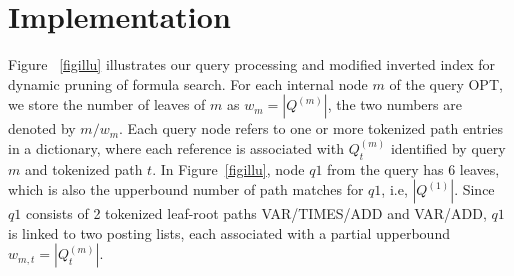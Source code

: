 \documentclass[runningheads]{llncs}
\begin{document}







\section{Implementation}

Figure ~\ref{figillu} illustrates our query processing and modified inverted index for dynamic pruning of formula search.
For each internal node $m$ of the query OPT, we store the number of leaves of $m$  as $w_m = |Q^{(m)}|$, the two numbers are denoted by $m/w_m$.
Each query node refers to one or more tokenized path entries in a dictionary,
where each reference is associated with $Q^{(m)}_t$ identified by query $m$ and tokenized path $t$.
%
In Figure~\ref{figillu}, node $q1$ from the query has 6 leaves, which is also the upperbound number of path matches for $q1$, i.e, $|Q^{(1)}|$.
Since $q1$ consists of 2 tokenized leaf-root paths VAR/TIMES/ADD and VAR/ADD,
$q1$ is linked to two posting lists, each associated with a partial upperbound $w_{m, t} = |Q^{(m)}_t|$.
\end{document}
